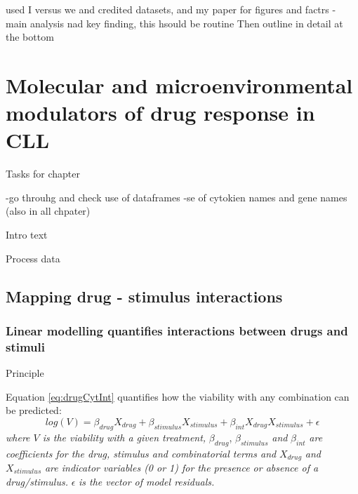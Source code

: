 \documentclass[11pt, a4paper, twosided]{book}
\begin{document}
used I versus we and credited datasets, and my paper for figures and factrs - main analysis nad key finding, this hsould be routine
Then outline in detail at the bottom

\hypertarget{molecular-and-microenvironmental-modulators-of-drug-response-in-cll}{%
\chapter{Molecular and microenvironmental modulators of drug response in CLL}\label{molecular-and-microenvironmental-modulators-of-drug-response-in-cll}}

Tasks for chapter

-go throuhg and check use of dataframes
-se of cytokien names and gene names
(also in all chpater)

Intro text

Process data

\hypertarget{mapping-drug---stimulus-interactions}{%
\section{Mapping drug - stimulus interactions}\label{mapping-drug---stimulus-interactions}}

\hypertarget{linear-modelling-quantifies-interactions-between-drugs-and-stimuli}{%
\subsection{Linear modelling quantifies interactions between drugs and stimuli}\label{linear-modelling-quantifies-interactions-between-drugs-and-stimuli}}

Principle

Equation \eqref{eq:drugCytInt} quantifies how the viability with any combination can be predicted:
\begin{equation}
            log(V) = \beta_{drug}X_{drug} + \beta_{stimulus}X_{stimulus} + \beta_{int}X_{drug}X_{stimulus} + \epsilon
                                       \label{eq:drugCytInt}
    \end{equation}
\emph{where \(V\) is the viability with a given treatment,} \(\beta_{drug}\), \(\beta_{stimulus}\) \emph{and} \(\beta_{int}\) \emph{are coefficients for the drug, stimulus and combinatorial terms and} \(X_{drug}\) \emph{and} \(X_{stimulus}\) \emph{are indicator variables (0 or 1) for the presence or absence of a drug/stimulus.} \(\epsilon\) \emph{is the vector of model residuals.}
\end{document}
